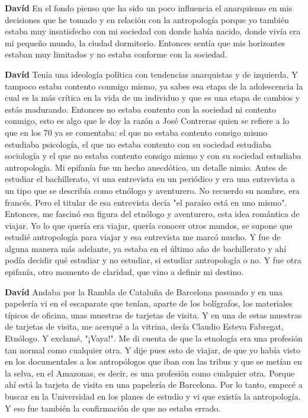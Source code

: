 \documentclass[
  spanish,
  11pt,
  a4paper,
]{scrbook}
\newenvironment{transcripcion}{
    \begin{list}{}{
        \setlength{\leftmargin}{1.5em}  %
        \setlength{\rightmargin}{0em}
        \setlength{\itemsep}{0.2em}     %
        \setlength{\parsep}{0.0em}
        \setlength{\listparindent}{0pt}
    }
}{
    \end{list}
}
\newcommand{\personaje}[1]{\textbf{#1}\quad}
\begin{document}
\begin{transcripcion}
\item \personaje{Davíd} En el fondo pienso que ha sido un poco influencia el anarquismo en mis decisiones que he tomado y en relación con la antropología porque yo también estaba muy insatisfecho con mi sociedad con donde había nacido, donde vivía era mi pequeño mundo, la ciudad dormitorio. Entonces sentía que mis horizontes estaban muy limitados y no estaba conforme con la sociedad.

\item \personaje{Davíd} Tenía una ideología política con tendencias anarquistas y de izquierda. Y tampoco estaba contento conmigo mismo, ya sabes esa etapa de la adolescencia la cual es la más crítica en la vida de un individuo y que es una etapa de cambios y estás madurando. Entonces no estaba contento con la sociedad ni contento conmigo, esto es algo que le doy la razón a José Contreras quien se refiere a lo que en los 70 ya se comentaba: el que no estaba contento consigo mismo estudiaba psicología, el que no estaba contento con su sociedad estudiaba sociología y el que no estaba contento consigo mismo y con su sociedad estudiaba antropología. Mi epifanía fue un hecho anecdótico, un detalle nimio. Antes de estudiar el bachillerato, vi una entrevista en un periódico y era una entrevista a un tipo que se describía como etnólogo y aventurero. No recuerdo su nombre, era francés. Pero el titular de esa entrevista decía "el paraíso está en uno mismo". Entonces, me fascinó esa figura del etnólogo y aventurero, esta idea romántica de viajar. Yo lo que quería era viajar, quería conocer otros mundos, se supone que estudié antropología para viajar y esa entrevista me marcó mucho. Y fue de alguna manera más adelante, ya estaba en el último año de bachillerato y ahí podía decidir qué estudiar y no estudiar, si estudiar antropología o no. Y fue otra epifanía, otro momento de claridad, que vino a definir mi destino.

\item \personaje{Davíd} Andaba por la Rambla de Cataluña de Barcelona paseando y en una papelería vi en el escaparate que tenían, aparte de los bolígrafos, los materiales típicos de oficina, unas muestras de tarjetas de visita. Y en una de estas muestras de tarjetas de visita, me acerqué a la vitrina, decía Claudio Esteva Fabregat, Etnólogo. Y exclamé, "¡Vaya!". Me di cuenta de que la etnología era una profesión tan normal como cualquier otra. Y dije pues esto de viajar, de que yo había visto en los documentales a los antropólogos que iban con las tribus y que se metían en la selva, en el Amazonas, es decir, es una profesión como cualquier otra. Porque ahí está la tarjeta de visita en una papelería de Barcelona. Por lo tanto, empecé a buscar en la Universidad en los planes de estudio y vi que existía la antropología. Y eso fue también la confirmación de que no estaba errado.


\end{transcripcion}
\end{document}
